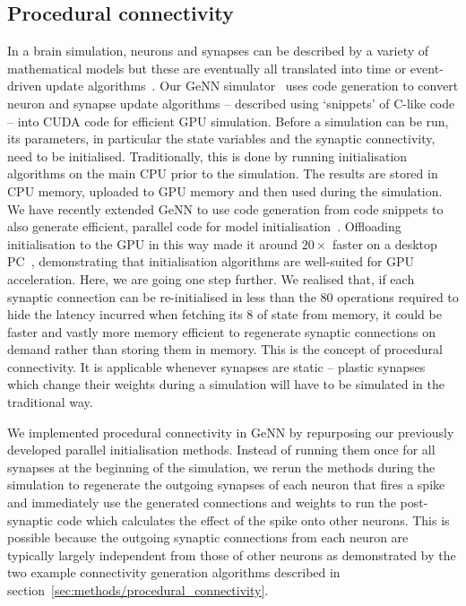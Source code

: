 \documentclass[9pt,a4paper]{amsart}
\begin{document}
\subsection{Procedural connectivity}
\label{sec:results/procedural}
In a brain simulation, neurons and synapses can be described by a variety of mathematical models but these are eventually all translated into time or event-driven update algorithms~\citep{Brette2007}.
Our GeNN simulator~\citep{Yavuz2016} uses code generation to convert neuron and synapse update algorithms -- described using `snippets' of C-like code -- into CUDA code for efficient GPU simulation.
Before a simulation can be run, its parameters, in particular the state variables and the synaptic connectivity, need to be initialised.
Traditionally, this is done by running initialisation algorithms on the main CPU prior to the simulation.
The results are stored in CPU memory, uploaded to GPU memory and then used during the simulation.
We have recently extended GeNN to use code generation from code snippets to also generate efficient, parallel code for model initialisation~\citep{Knight2018}.
Offloading initialisation to the GPU in this way made it around $20\times$ faster on a desktop PC~\citep{Knight2018}, demonstrating that initialisation algorithms are well-suited for GPU acceleration.
Here, we are going one step further.
We realised that, if each synaptic connection can be re-initialised in less than the 80 operations required to hide the latency incurred when fetching its \SI{8}{\byte} of state from memory, it could be faster and vastly more memory efficient to regenerate synaptic connections on demand rather than storing them in memory.
This is the concept of procedural connectivity.
It is applicable whenever synapses are static -- plastic synapses which change their weights during a simulation will have to be simulated in the traditional way.

We implemented procedural connectivity in GeNN by repurposing our previously developed parallel initialisation methods.
Instead of running them once for all synapses at the beginning of the simulation, we rerun the methods during the simulation to regenerate the outgoing synapses of each neuron that fires a spike and immediately use the generated connections and weights to run the post-synaptic code which calculates the effect of the spike onto other neurons.
This is possible because the outgoing synaptic connections from each neuron are typically largely independent from those of other neurons as demonstrated by the two example connectivity generation algorithms described in section~\ref{sec:methods/procedural_connectivity}.
\end{document}
